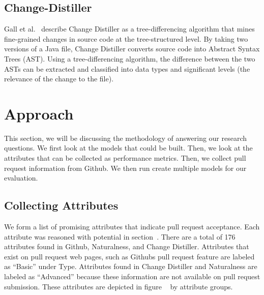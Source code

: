\documentclass[10pt, conference]{IEEEtran}
\begin{document}
\subsection{Change-Distiller}
Gall et al.~\cite{Gall:2009:CAE:1495795.1495953} describe Change Distiller as a tree-differencing algorithm that mines fine-grained changes in source code at the tree-structured level. By taking two versions of a Java file, Change Distiller converts source code into Abstract Syntax Trees (AST). Using a tree-differencing algorithm, the difference between the two ASTs can be extracted and classified into data types and significant levels (the relevance of the change to the file). 

\section{Approach}
\label{approach}
This section, we will be discussing the methodology of answering our research questions. We first look at the models that could be built. Then, we look at the attributes that can be collected as performance metrics. Then, we collect pull request information from Github. We then run create multiple models for our evaluation.

\subsection{Collecting Attributes}
We form a list of promising attributes that indicate pull request acceptance. Each attribute was reasoned with potential in section~\cite{background}. There are a total of 176 attributes found in Github, Naturalness, and Change Distiller. Attributes that exist on pull request web pages, such as Github\textquotesingle s pull request feature are labeled as \enquote{Basic} under Type. Attributes found in Change Distiller and Naturalness are labeled as \enquote{Advanced} because these information are not available on pull request submission. These attributes are depicted in figure ~\cite{figureListOfMetrics} by attribute groups.
\end{document}
